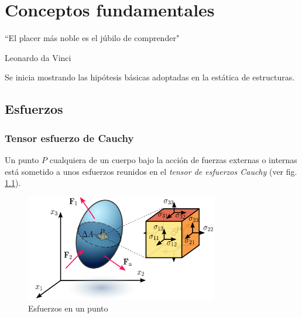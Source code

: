 \setchapterpreamble[u]{\margintoc}

\chapter{Conceptos fundamentales} \label{chap:fundamentales}

\begin{kaobox}
	``El placer más noble es el júbilo de comprender"
	\begin{flushright}
		Leonardo da Vinci
	\end{flushright}
\end{kaobox}


Se inicia mostrando las hipótesis básicas adoptadas en la estática de estructuras.


\section{Esfuerzos}
	
	\subsection{Tensor esfuerzo de Cauchy}
	 
	Un punto $P$ cualquiera de un cuerpo bajo la acción de fuerzas
	externas o internas está sometido a unos esfuerzos reunidos en el \textit{tensor de esfuerzos Cauchy} (ver fig. \ref{Sigmas}).
	
	\begin{figure}[ht]
		\centering
		\includegraphics[width=0.75\textwidth]{figs/intro/Sigmas}
		\caption{Esfuerzos en un punto}
		\label{Sigmas}
	\end{figure}
	
